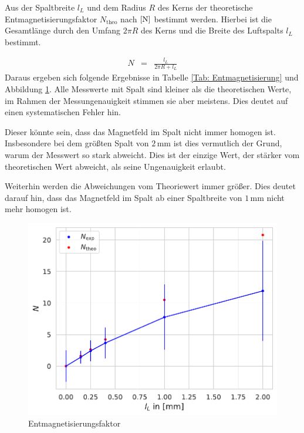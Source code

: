 \documentclass[12pt,a4paper]{scrartcl}
\numberwithin{equation}{section} %
\begin{document}
Aus der Spaltbreite $l_L$ und dem Radius $R$ des Kerns der theoretische Entmagnetisierungsfaktor $N_\mathrm{theo}$ nach $\eqref{N}$ bestimmt werden. Hierbei ist die Gesamtlänge durch den Umfang $2\pi R$ des Kerns und die Breite des Luftspalts $l_L$
bestimmt.

\begin{eqnarray}
    N &=& \frac{l_L}{2\pi R + l_L}
\end{eqnarray}
Daraus ergeben sich folgende Ergebnisse in Tabelle \ref{Tab: Entmagnetisierung} und Abbildung \ref{Abb: Entmagnetisierung}. Alle Messwerte mit Spalt sind kleiner als die theoretischen Werte, im Rahmen der Messungenauigkeit stimmen sie aber meistens. Dies deutet auf einen systematischen Fehler hin.

Dieser könnte sein, dass das Magnetfeld im Spalt nicht immer homogen ist. Insbesondere bei dem größten Spalt von $2\mathrm{\,mm}$ ist dies vermutlich der Grund, warum der Messwert so stark abweicht. Dies ist der einzige Wert, der stärker vom theoretischen Wert abweicht, als seine Ungenauigkeit erlaubt.

Weiterhin werden die Abweichungen vom Theoriewert immer größer. Dies deutet darauf hin, dass das Magnetfeld im Spalt ab einer Spaltbreite von $1\mathrm{\,mm}$ nicht mehr homogen ist.

\begin{figure}[ht]
	\centering
	\includegraphics[scale=0.6]{../media/B2.4/3.3.4_N.pdf}
	\caption{Entmagnetisierungsfaktor}
	\label{Abb: Entmagnetisierung}
\end{figure}
\end{document}

